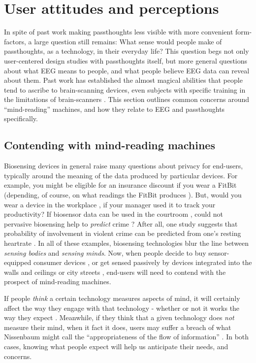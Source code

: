 \documentclass[sigconf]{acmart}
\begin{document}
\section{User attitudes and perceptions}
\label{sec:orgcd9b457}

In spite of past work making passthoughts less visible with more convenient form-factors,
a large question still remains:
What sense would people make of passthoughts, as a technology, in their everyday life?
This question begs not only user-centered design studies with passthoughts itself,
but more general questions about what EEG means to people,
and what people believe EEG data can reveal about them.
Past work has established the almost magical abilities that people tend to ascribe to brain-scanning devices, even subjects with specific training in the limitations of brain-scanners \cite{Ali2014a}.
This section outlines common concerns around ``mind-reading'' machines, and how they relate to EEG and passthoughts specifically.

\subsection{Contending with mind-reading machines}
\label{sec:org6713e76}

Biosensing devices in general raise many questions about privacy for end-users,
typically around the meaning of the data produced by particular devices.
For example, you might be eligible for an insurance discount if you wear a FitBit \cite{Bernard2015} (depending, of course, on what readings the FitBit produces \cite{Brain2015}). 
But, would you wear a device in the workplace \cite{solon2015}, if your manager used it to track your productivity?
If biosensor data can be used in the courtroom \cite{Crawford2014}, could not pervasive biosensing help to \emph{predict} crime \cite{Thompson2011}? 
After all, one study suggests that probability of involvement in violent crime can be predicted from one's resting heartrate \cite{Latvala2015}. 
In all of these examples, biosensing technologies blur the line between \emph{sensing bodies} and \emph{sensing minds}. 
Now, when people decide to buy sensor-equipped consumer devices \cite{Stables2016}, or get sensed passively by devices integrated into the walls and ceilings \cite{Adib2015} or city streets \cite{Thrift2014}, end-users will need to contend with the prospect of mind-reading machines.

If people \emph{think} a certain technology measures aspects of mind, it will certainly affect the way they engage with that technology - whether or not it works the way they expect \cite{Ali2014a}. Meanwhile, if they think that a given technology does \emph{not} measure their mind, when it fact it does, users may suffer a breach of what Nissenbaum might call the ``appropriateness of the flow of information'' \cite{Doyle2011}. In both cases, knowing what people expect will help us anticipate their needs, and concerns.
\end{document}
